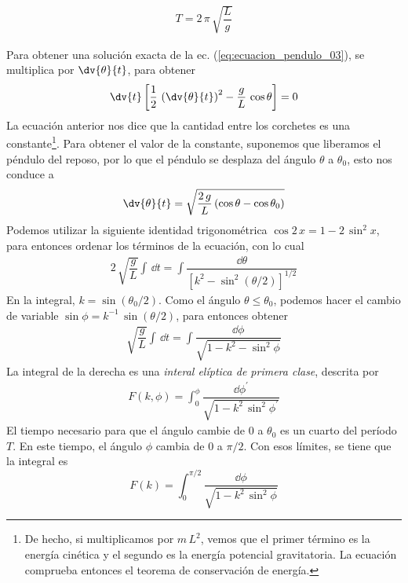 \begin{align*}
T = 2 \, \pi \,\sqrt{\dfrac{L}{g}}
\end{align*}
\par
Para obtener una solución exacta de la ec. (\ref{eq:ecuacion_pendulo_03}), se multiplica por $\displaystyle{\dv{\theta}{t}}$, para obtener
\begin{equation}
\dv{t} \left[ \dfrac{1}{2} \, \left( \dv{\theta}{t} \right)^{2} - \dfrac{g}{L} \, \cos \theta \right] = 0
\label{eq:ecuacion_pendulo_04}
\end{equation}
La ecuación anterior nos dice que la cantidad entre los corchetes es una constante\footnote{De hecho, si multiplicamos por $m \, L^{2}$, vemos que el primer término es la energía cinética y el segundo es la energía potencial gravitatoria. La ecuación comprueba entonces el teorema de conservación de energía.}. Para obtener el valor de la constante, suponemos que liberamos el péndulo del reposo, por lo que el péndulo se desplaza del ángulo $\theta$ a $\theta_{0}$, esto nos conduce a
\begin{align*}
\dv{\theta}{t} = \sqrt{\dfrac{2 \, g}{L} \, (\cos \theta - \cos \theta_{0})}
\end{align*}
Podemos utilizar la siguiente identidad trigonométrica $\cos 2 \, x = 1 - 2 \, \sin^{2} x$, para entonces ordenar los términos de la ecuación, con lo cual
\begin{align*}
2 \, \sqrt{\dfrac{g}{L}} \int \, \dd{t} = \int \dfrac{\dd{\theta}}{[k^{2} - \sin^{2} (\theta/2)]^{1/2}}
\end{align*}
En la integral, $k = \sin (\theta_{0}/2)$. Como el ángulo $\theta \leq \theta_{0}$, podemos hacer el cambio de variable $\sin \phi = k^{-1} \, \sin (\theta/2)$, para entonces obtener
\begin{align*}
\sqrt{\dfrac{g}{L}} \int \, \dd{t} = \int \dfrac{\dd{\phi}}{\sqrt{1 - k^{2} - \sin^{2} \phi}}
\end{align*}
La integral de la derecha es una \emph{interal elíptica de primera clase}, descrita por
\begin{align*}
F(k , \phi) = \int_{0}^{\phi} \dfrac{\dd{\phi^{\prime}}}{\sqrt{1 - k^{2} \, \sin^{2} \phi^{\prime} }}
\end{align*}
El tiempo necesario para que el ángulo cambie de $0$ a $\theta_{0}$ es un cuarto del período $T$. En este tiempo, el ángulo $\phi$ cambia de $0$ a $\pi/2$. Con esos límites, se tiene que la integral es
\begin{equation}
F(k) = \int_{0}^{\pi/2} \dfrac{\dd \phi}{\sqrt{1 - k^{2} \, \sin^{2} \phi} }
\label{eq:ecuacion_pendulo_05}
\end{equation}

